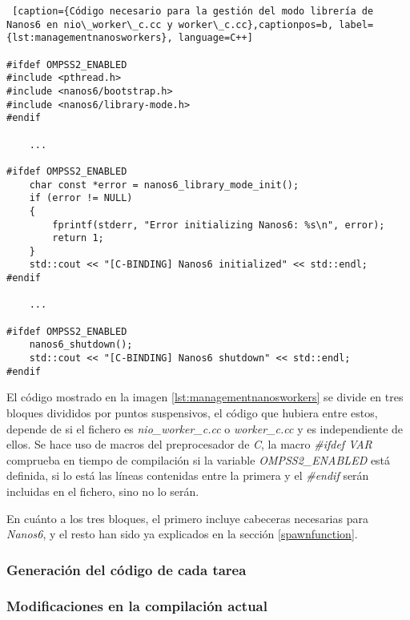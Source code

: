 \begin{lstlisting} [caption={Código necesario para la gestión del modo librería de Nanos6 en nio\_worker\_c.cc y worker\_c.cc},captionpos=b, label={lst:managementnanosworkers}, language=C++]

#ifdef OMPSS2_ENABLED
#include <pthread.h>
#include <nanos6/bootstrap.h>
#include <nanos6/library-mode.h>
#endif

    ...

#ifdef OMPSS2_ENABLED
    char const *error = nanos6_library_mode_init();
    if (error != NULL)
    {
        fprintf(stderr, "Error initializing Nanos6: %s\n", error);
        return 1;
    }
    std::cout << "[C-BINDING] Nanos6 initialized" << std::endl;
#endif

    ...
    
#ifdef OMPSS2_ENABLED
    nanos6_shutdown();
    std::cout << "[C-BINDING] Nanos6 shutdown" << std::endl;
#endif

\end{lstlisting}

El código mostrado en la imagen \ref{lst:managementnanosworkers} se divide en tres bloques divididos por puntos suspensivos, el código que hubiera entre estos, depende de si el fichero es \textit{nio\_worker\_c.cc} o \textit{worker\_c.cc} y es independiente de ellos. Se hace uso de macros del preprocesador de \textit{C}, la macro \textit{\#ifdef VAR} comprueba en tiempo de compilación si la variable \textit{OMPSS2\_ENABLED} está definida, si lo está las líneas contenidas entre la primera y el \textit{\#endif} serán incluidas en el fichero, sino no lo serán.
\par\medskip

En cuánto a los tres bloques, el primero incluye cabeceras necesarias para \textit{Nanos6}, y el resto han sido ya explicados en la sección \ref{spawnfunction}.

\subsubsection{Generación del código de cada tarea}


\subsubsection{Modificaciones en la compilación actual}



